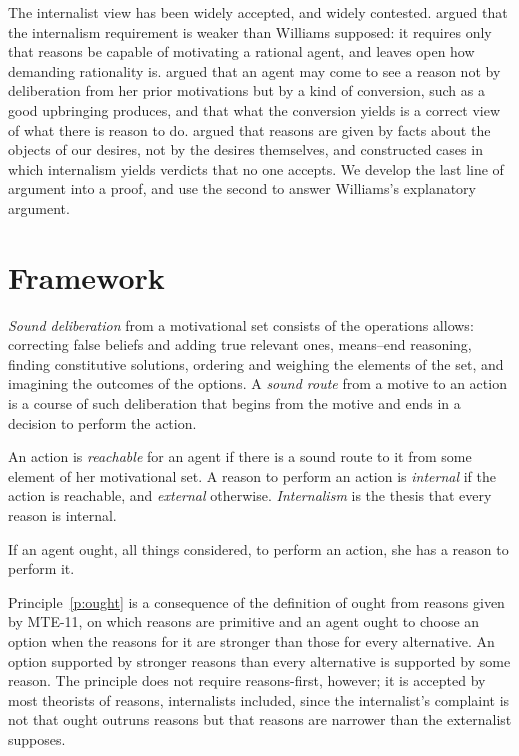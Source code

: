 \documentclass{situationist-preprint}
\begin{document}
The internalist view has been widely accepted, and widely contested. \citet{Korsgaard1986} argued that the internalism requirement is weaker than Williams supposed: it requires only that reasons be capable of motivating a rational agent, and leaves open how demanding rationality is. \citet{McDowell1995} argued that an agent may come to see a reason not by deliberation from her prior motivations but by a kind of conversion, such as a good upbringing produces, and that what the conversion yields is a correct view of what there is reason to do. \citet{Parfit2011} argued that reasons are given by facts about the objects of our desires, not by the desires themselves, and constructed cases in which internalism yields verdicts that no one accepts. We develop the last line of argument into a proof, and use the second to answer Williams's explanatory argument.

\section{Framework}

\begin{definition}\label{d:sound}
\emph{Sound deliberation} from a motivational set consists of the operations \citet{Williams1981} allows: correcting false beliefs and adding true relevant ones, means--end reasoning, finding constitutive solutions, ordering and weighing the elements of the set, and imagining the outcomes of the options. A \emph{sound route} from a motive to an action is a course of such deliberation that begins from the motive and ends in a decision to perform the action.
\end{definition}

\begin{definition}\label{d:int}
An action is \emph{reachable} for an agent if there is a sound route to it from some element of her motivational set. A reason to perform an action is \emph{internal} if the action is reachable, and \emph{external} otherwise. \emph{Internalism} is the thesis that every reason is internal.
\end{definition}

\begin{principle}\label{p:ought}
If an agent ought, all things considered, to perform an action, she has a reason to perform it.
\end{principle}

Principle~\ref{p:ought} is a consequence of the definition of ought from reasons given by MTE-11, on which reasons are primitive and an agent ought to choose an option when the reasons for it are stronger than those for every alternative. An option supported by stronger reasons than every alternative is supported by some reason. The principle does not require reasons-first, however; it is accepted by most theorists of reasons, internalists included, since the internalist's complaint is not that ought outruns reasons but that reasons are narrower than the externalist supposes.
\end{document}
